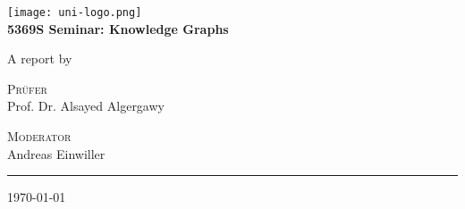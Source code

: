 \begin{titlepage}
    \centering
    \begin{onehalfspace}
    	
        	\texttt{[image: uni-logo.png]}\\
        	\vspace{1.0cm}
        	{\Large \bfseries 5369S Seminar: Knowledge Graphs }\\

        	\vspace{2.5cm}

            \begin{doublespace}
            	{\textsf{\Huge{\thetitle}}}
            \end{doublespace}

        	\vspace{2cm}

            {\Large A report by}\\

        	\vspace{1cm}

        	{\bfseries \large{\theauthor}}

        	\vfill

        	{\Large
                \textsc{Pr\"ufer} \\
                Prof. Dr. Alsayed Algergawy

				\textsc{Moderator} \\
				Andreas Einwiller
        	}

        	\vspace{1.5cm}

        	\parbox{\linewidth}{\hrule\strut}

            \vfill

			{\large \today}
    \end{onehalfspace}
\end{titlepage}
